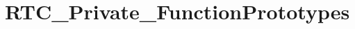 \hypertarget{group___r_t_c___private___function_prototypes}{\section{R\-T\-C\-\_\-\-Private\-\_\-\-Function\-Prototypes}
\label{group___r_t_c___private___function_prototypes}
}

